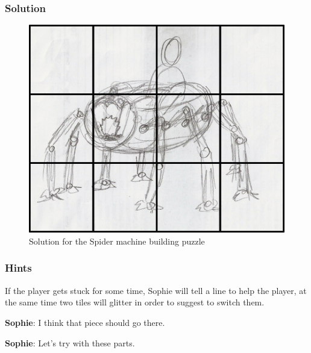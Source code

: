 \subsubsection*{Solution}
\begin{figure}[H]
  \centering
  \includegraphics[width=\textwidth]{Images/Puzzles/castleOfDynamia1Solution}
  \caption{Solution for the Spider machine building puzzle}
\end{figure}


\subsubsection*{Hints}
If the player gets stuck for some time, Sophie will tell a line to help the player, at the same time two tiles will glitter in order to suggest to switch them.

\textbf{Sophie}: I think that piece should go there.

\textbf{Sophie}: Let's try with these parts.
